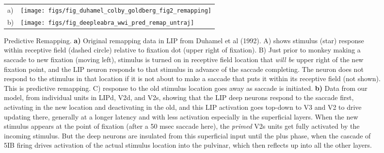 \documentclass[11pt,twoside]{article}
\newif\myifpdf
\begin{document}
\begin{figure}
  \begin{center}
    \begin{tabular}{ll}
      \parbox[b]{.1em}{a) \vspace*{1.4in}} &
      \texttt{[image: figs/fig\_duhamel\_colby\_goldberg\_fig2\_remapping]} \\
      \parbox[b]{.1em}{b) \vspace*{1.4in}} &
      \texttt{[image: figs/fig\_deepleabra\_wwi\_pred\_remap\_untraj]}
    \end{tabular}
  \end{center}
  \caption{Predictive Remapping.  {\bf a)} Original remapping data in LIP from Duhamel et al (1992).  A) shows stimulus (star) response within receptive field (dashed circle) relative to fixation dot (upper right of fixation).  B) Just prior to monkey making a saccade to new fixation (moving left), stimulus is turned on in receptive field location that {\em will be} upper right of the new fixation point, and the LIP neuron responds to that stimulus in advance of the saccade completing.  The neuron does not respond to the stimulus in that location if it is not about to make a saccade that puts it within its receptive field (not shown).  This is predictive remapping.  C) response to the old stimulus location goes away as saccade is initiated.  {\bf b)} Data from our model, from individual units in LIPd, V2d, and V2s, showing that the LIP deep neurons respond to the saccade first, activating in the new location and deactivating in the old, and this LIP activation goes top-down to V3 and V2 to drive updating there, generally at a longer latency and with less activation especially in the superficial layers.  When the new stimulus appears at the point of fixation (after a 50 msec saccade here), the {\em primed} V2s units get fully activated by the incoming stimulus.  But the deep neurons are insulated from this superficial input until the plus phase, when the cascade of 5IB firing drives activation of the actual stimulus location into the pulvinar, which then reflects up into all the other layers.}
  \label{fig.remap_units}
\end{figure}
\end{document}
